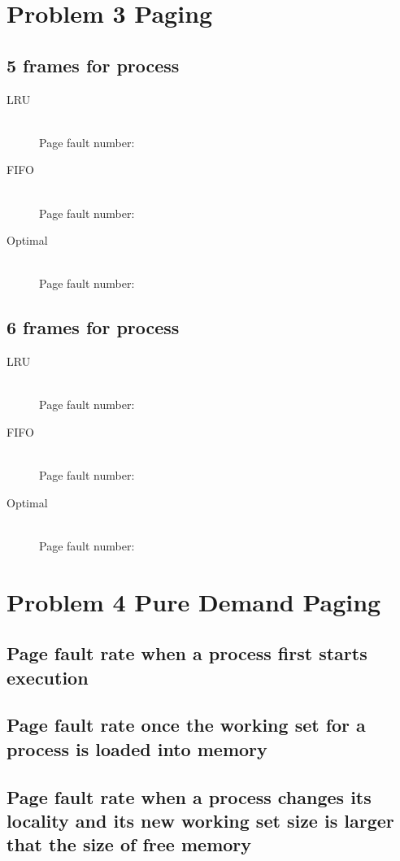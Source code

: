 \documentclass{article}
\begin{document}
\newpage

\section{Problem 3 Paging}

\subsection{5 frames for process}
\begin{description}
    \item[LRU] \hfill \\ 
    Page fault number:
    \item[FIFO] \hfill \\
    Page fault number:
    \item[Optimal] \hfill \\
    Page fault number:
\end{description}
\subsection{6 frames for process}
\begin{description}
    \item[LRU] \hfill \\ 
    Page fault number: 
    \item[FIFO] \hfill \\
    Page fault number: 
    \item[Optimal] \hfill \\
    Page fault number: 
\end{description}

\newpage
\section{Problem 4 Pure Demand Paging}
\subsection{Page fault rate when a process first starts execution}
\subsection{Page fault rate once the working set for a process is loaded into memory}
\subsection{Page fault rate when a process changes its locality and its new working set size is larger that the size of free memory}
\end{document}
